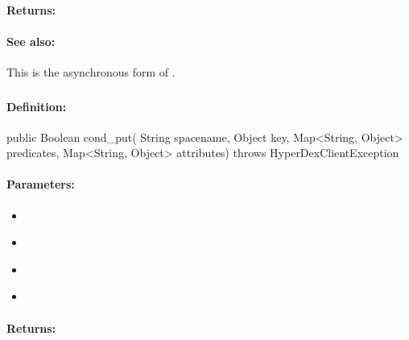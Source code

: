\paragraph{Returns:}


\paragraph{See also:}  This is the asynchronous form of .

\pagebreak
\subsubsection{}
\label{api:java:cond_put}


\paragraph{Definition:}
\begin{javacode}
public Boolean cond_put(
        String spacename,
        Object key,
        Map<String, Object> predicates,
        Map<String, Object> attributes) throws HyperDexClientException
\end{javacode}

\paragraph{Parameters:}
\begin{itemize}[noitemsep]
\item {}\\

\item {}\\

\item {}\\

\item {}\\

\end{itemize}

\paragraph{Returns:}


